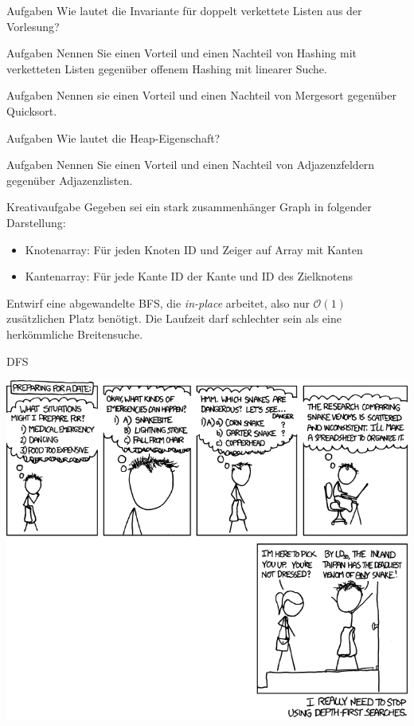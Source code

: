 \begin{frame}{Aufgaben}
	Wie lautet die Invariante für doppelt verkettete Listen aus der Vorlesung?
\end{frame}

\begin{frame}{Aufgaben}
	Nennen Sie einen Vorteil und einen Nachteil von Hashing mit verketteten Listen gegenüber offenem Hashing mit linearer Suche.
\end{frame}

\begin{frame}{Aufgaben}
	Nennen sie einen Vorteil und einen Nachteil von Mergesort gegenüber Quicksort.
\end{frame}

\begin{frame}{Aufgaben}
	Wie lautet die Heap-Eigenschaft?
\end{frame}

\begin{frame}{Aufgaben}
	Nennen Sie einen Vorteil und einen Nachteil von Adjazenzfeldern gegenüber Adjazenzlisten.
\end{frame}

\begin{frame}{Kreativaufgabe}
	Gegeben sei ein stark zusammenhänger Graph in folgender Darstellung:

	\begin{itemize}
		\item Knotenarray: Für jeden Knoten ID und Zeiger auf Array mit Kanten
		\item Kantenarray: Für jede Kante ID der Kante und ID des Zielknotens
	\end{itemize}

	Entwirf eine abgewandelte BFS, die \emph{in-place} arbeitet, also nur $\mathcal{O}(1)$ zusätzlichen Platz benötigt.
	Die Laufzeit darf schlechter sein als eine herkömmliche Breitensuche.
\end{frame}

\begin{frame}{DFS}
	\begin{center}
		\includegraphics[width=\textwidth,height=\textheight,keepaspectratio]{images/dfs}
	\end{center}
\end{frame}


